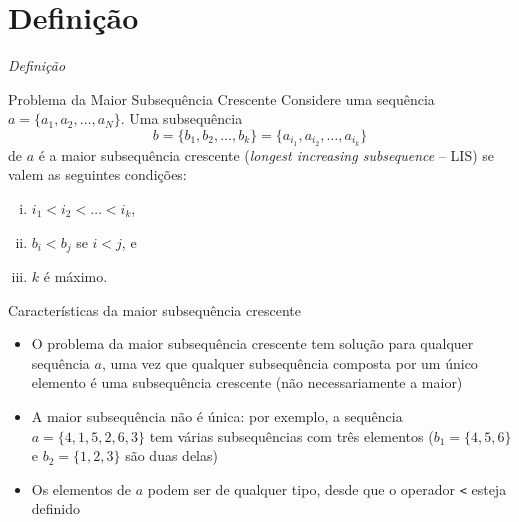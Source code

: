 \section{Definição}

\begin{frame}[fragile]{{\it Definição}}

    \begin{block}{Problema da Maior Subsequência Crescente}
        Considere uma sequência $a = \{ a_1, a_2, \ldots, a_N \}$.
        Uma subsequência 
        \[
            b = \{ b_1, b_2, \ldots, b_k \} = \{ a_{i_1}, a_{i_2}, \ldots, a_{i_k} \}
        \]
        de $a$ é a maior subsequência crescente (\textit{longest increasing subsequence} --
        LIS) se valem as seguintes condições:
        \begin{enumerate}[i.]
            \item $i_1 < i_2 < \ldots < i_k$, 
            \item $b_i < b_j$ se $i < j$, e
            \item $k$ é máximo.
        \end{enumerate}
    \end{block}

\end{frame}

\begin{frame}[fragile]{Características da maior subsequência crescente}

    \begin{itemize}
        \item O problema da maior subsequência crescente tem solução para qualquer 
            sequência $a$, uma vez que qualquer subsequência composta por um único elemento
            é uma subsequência crescente (não necessariamente a maior)

        \item A maior subsequência não é única: por exemplo, a sequência $a = \{ 4, 1, 5, 2,
            6, 3 \}$ tem várias subsequências com três elementos ($b_1 = \{ 4, 5 ,6 \}$ e 
            $b_2 = \{ 1, 2, 3 \}$ são duas delas)

        \item Os elementos de $a$ podem ser de qualquer tipo, desde que o operador 
            \texttt{<} esteja definido
    \end{itemize}

\end{frame}
